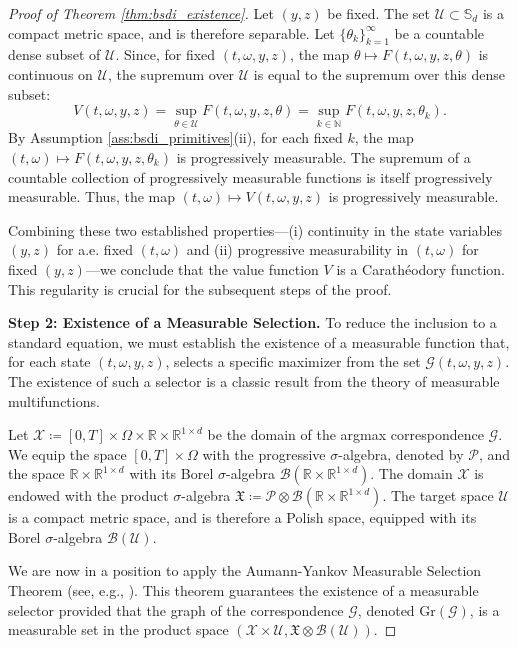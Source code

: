 \documentclass[12pt, letterpaper]{amsart}
\newcommand{\Ucal}{\mathcal{U}}
\newcommand{\Sd}{\mathbb{S}_d}
\newcommand{\R}{\mathbb{R}}
\theoremstyle{plain}
\theoremstyle{definition}
\theoremstyle{remark}
\numberwithin{equation}{section} %
\begin{document}
\begin{proof}[Proof of Theorem \ref{thm:bsdi_existence}]
Let $(y,z)$ be fixed. The set $\Ucal \subset \Sd$ is a compact metric space, and is therefore separable. Let $\{\theta_k\}_{k=1}^\infty$ be a countable dense subset of $\Ucal$. Since, for fixed $(t,\omega,y,z)$, the map $\theta \mapsto F(t,\omega,y,z,\theta)$ is continuous on $\Ucal$, the supremum over $\Ucal$ is equal to the supremum over this dense subset:
\[ V(t,\omega,y,z) = \sup_{\theta \in \Ucal} F(t,\omega,y,z,\theta) = \sup_{k \in \mathbb{N}} F(t,\omega,y,z,\theta_k). \]
By Assumption \ref{ass:bsdi_primitives}(ii), for each fixed $k$, the map $(t,\omega) \mapsto F(t,\omega,y,z,\theta_k)$ is progressively measurable. The supremum of a countable collection of progressively measurable functions is itself progressively measurable. Thus, the map $(t,\omega) \mapsto V(t,\omega,y,z)$ is progressively measurable.

Combining these two established properties—(i) continuity in the state variables $(y,z)$ for a.e. fixed $(t,\omega)$ and (ii) progressive measurability in $(t,\omega)$ for fixed $(y,z)$—we conclude that the value function $V$ is a Carathéodory function. This regularity is crucial for the subsequent steps of the proof.


\vspace{1ex}
\noindent\textbf{Step 2: Existence of a Measurable Selection.}
To reduce the inclusion to a standard equation, we must establish the existence of a measurable function that, for each state $(t, \omega, y, z)$, selects a specific maximizer from the set $\mathcal{G}(t, \omega, y, z)$. The existence of such a selector is a classic result from the theory of measurable multifunctions.

Let $\mathcal{X} \coloneqq [0,T] \times \Omega \times \R \times \R^{1\times d}$ be the domain of the argmax correspondence $\mathcal{G}$. We equip the space $[0,T] \times \Omega$ with the progressive $\sigma$-algebra, denoted by $\mathcal{P}$, and the space $\R \times \R^{1\times d}$ with its Borel $\sigma$-algebra $\mathcal{B}(\R \times \R^{1\times d})$. The domain $\mathcal{X}$ is endowed with the product $\sigma$-algebra $\mathfrak{X} \coloneqq \mathcal{P} \otimes \mathcal{B}(\R \times \R^{1\times d})$. The target space $\Ucal$ is a compact metric space, and is therefore a Polish space, equipped with its Borel $\sigma$-algebra $\mathcal{B}(\Ucal)$.

We are now in a position to apply the Aumann-Yankov Measurable Selection Theorem (see, e.g., \cite[Theorem 8.1.3]{CastaingValadier1977}). This theorem guarantees the existence of a measurable selector provided that the graph of the correspondence $\mathcal{G}$, denoted $\mathrm{Gr}(\mathcal{G})$, is a measurable set in the product space $(\mathcal{X} \times \Ucal, \mathfrak{X} \otimes \mathcal{B}(\Ucal))$.


\end{proof}
\end{document}
